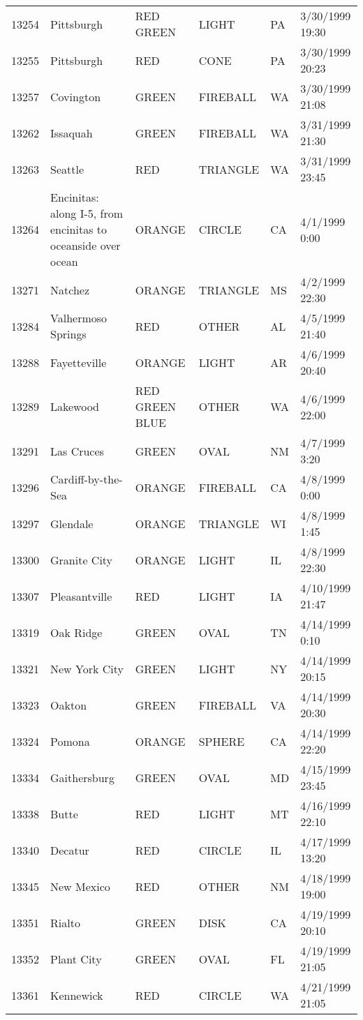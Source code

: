 \begin{tabular}{llllll}
13254 & Pittsburgh & RED GREEN & LIGHT & PA & 3/30/1999 19:30 \\
13255 & Pittsburgh & RED & CONE & PA & 3/30/1999 20:23 \\
13257 & Covington & GREEN & FIREBALL & WA & 3/30/1999 21:08 \\
13262 & Issaquah & GREEN & FIREBALL & WA & 3/31/1999 21:30 \\
13263 & Seattle & RED & TRIANGLE & WA & 3/31/1999 23:45 \\
13264 & Encinitas: along I-5, from encinitas to oceanside over ocean & ORANGE & CIRCLE & CA & 4/1/1999 0:00 \\
13271 & Natchez & ORANGE & TRIANGLE & MS & 4/2/1999 22:30 \\
13284 & Valhermoso Springs & RED & OTHER & AL & 4/5/1999 21:40 \\
13288 & Fayetteville & ORANGE & LIGHT & AR & 4/6/1999 20:40 \\
13289 & Lakewood & RED GREEN BLUE & OTHER & WA & 4/6/1999 22:00 \\
13291 & Las Cruces & GREEN & OVAL & NM & 4/7/1999 3:20 \\
13296 & Cardiff-by-the-Sea & ORANGE & FIREBALL & CA & 4/8/1999 0:00 \\
13297 & Glendale & ORANGE & TRIANGLE & WI & 4/8/1999 1:45 \\
13300 & Granite City & ORANGE & LIGHT & IL & 4/8/1999 22:30 \\
13307 & Pleasantville & RED & LIGHT & IA & 4/10/1999 21:47 \\
13319 & Oak Ridge & GREEN & OVAL & TN & 4/14/1999 0:10 \\
13321 & New York City & GREEN & LIGHT & NY & 4/14/1999 20:15 \\
13323 & Oakton & GREEN & FIREBALL & VA & 4/14/1999 20:30 \\
13324 & Pomona & ORANGE & SPHERE & CA & 4/14/1999 22:20 \\
13334 & Gaithersburg & GREEN & OVAL & MD & 4/15/1999 23:45 \\
13338 & Butte & RED & LIGHT & MT & 4/16/1999 22:10 \\
13340 & Decatur & RED & CIRCLE & IL & 4/17/1999 13:20 \\
13345 & New Mexico & RED & OTHER & NM & 4/18/1999 19:00 \\
13351 & Rialto & GREEN & DISK & CA & 4/19/1999 20:10 \\
13352 & Plant City & GREEN & OVAL & FL & 4/19/1999 21:05 \\
13361 & Kennewick & RED & CIRCLE & WA & 4/21/1999 21:05 \\

\end{tabular}
